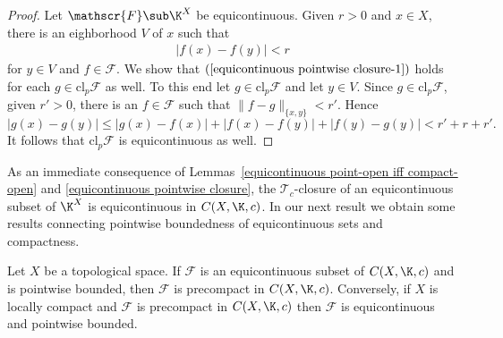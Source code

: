 \begin{proof}
Let $\mathscr{F}\sub\K^X$ be equicontinuous. Given $r>0$ and $x\in X$, there is an eighborhood $V$ of $x$ such that
\begin{align}\label{equicontinuous pointwise closure-1}
|f(x)-f(y)|<r
\end{align}
for $y\in V$ and $f\in \mathscr{F}$. We show that $(\ref{equicontinuous pointwise closure-1})$ holds for each $g\in\mathrm{cl}_p\mathscr{F}$ as well. To this end let $g\in\mathrm{cl}_p\mathscr{F}$ and let $y\in V$. Since $g\in\mathrm{cl}_p\mathscr{F}$, given $r'>0$, there is an $f\in \mathscr{F}$ such that $\|f-g\|_{\{x,y\}}<r'$. Hence
\[|g(x)-g(y)|\leq|g(x)-f(x)|+|f(x)-f(y)|+|f(y)-g(y)|<r'+r+r'.\]
It follows that $\mathrm{cl}_p\mathscr{F}$ is equicontinuous as well.
\end{proof}
As an immediate consequence of Lemmas~\ref{equicontinuous point-open iff compact-open} and \ref{equicontinuous pointwise closure}, the $\mathcal{T}_c$-closure of an equicontinuous subset of $\K^X$ is equicontinuous in $C(X,\K,c)$. In our next result we obtain some results connecting pointwise boundedness of equicontinuous sets and compactness.
\begin{theorem}\label{Arzel\'a-Ascoli precompact iff equi+point}
Let $X$ be a topological space. If $\mathscr{F}$ is an equicontinuous subset of $C(X,\K,c)$ and is pointwise bounded, then $\mathscr{F}$ is precompact in $C(X,\K,c)$. Conversely, if $X$ is locally compact and $\mathscr{F}$ is precompact in $C(X,\K,c)$ then $\mathscr{F}$ is equicontinuous and pointwise bounded.
\end{theorem}
